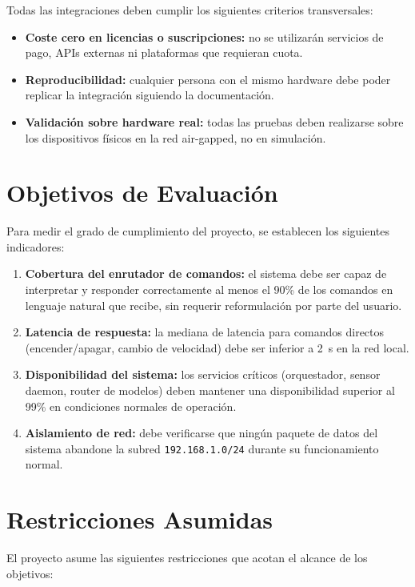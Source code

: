 Todas las integraciones deben cumplir los siguientes criterios transversales:
\begin{itemize}
    \item \textbf{Coste cero en licencias o suscripciones:} no se utilizarán servicios de pago, APIs externas ni plataformas que requieran cuota.
    \item \textbf{Reproducibilidad:} cualquier persona con el mismo hardware debe poder replicar la integración siguiendo la documentación.
    \item \textbf{Validación sobre hardware real:} todas las pruebas deben realizarse sobre los dispositivos físicos en la red air-gapped, no en simulación.
\end{itemize}

\section{Objetivos de Evaluación}

Para medir el grado de cumplimiento del proyecto, se establecen los siguientes indicadores:

\begin{enumerate}
    \item \textbf{Cobertura del enrutador de comandos:} el sistema debe ser capaz de interpretar y responder correctamente al menos el 90\% de los comandos en lenguaje natural que recibe, sin requerir reformulación por parte del usuario.
    \item \textbf{Latencia de respuesta:} la mediana de latencia para comandos directos (encender/apagar, cambio de velocidad) debe ser inferior a 2~s en la red local.
    \item \textbf{Disponibilidad del sistema:} los servicios críticos (orquestador, sensor daemon, router de modelos) deben mantener una disponibilidad superior al 99\% en condiciones normales de operación.
    \item \textbf{Aislamiento de red:} debe verificarse que ningún paquete de datos del sistema abandone la subred \texttt{192.168.1.0/24} durante su funcionamiento normal.
\end{enumerate}

\section{Restricciones Asumidas}

El proyecto asume las siguientes restricciones que acotan el alcance de los objetivos:

